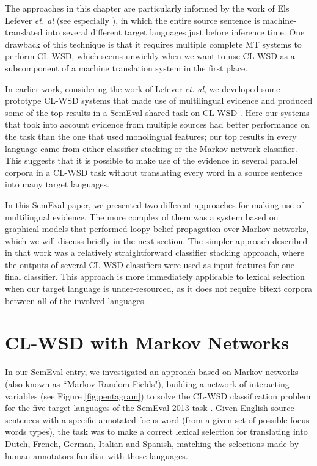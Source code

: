 The approaches in this chapter are particularly informed by the work of Els
Lefever \emph{et. al} (see especially
\cite{lefever-hoste-decock:2011:ACL-HLT2011}), in which the entire source
sentence is machine-translated into several different target languages just
before inference time. One drawback of this technique is that it requires
multiple complete MT systems to perform CL-WSD, which seems unwieldy when we
want to use CL-WSD as a subcomponent of a machine translation system in the
first place.

In earlier work, considering the work of Lefever \emph{et. al}, we developed
some prototype CL-WSD systems that made use of multilingual evidence
\cite{rudnick-liu-gasser:2013:SemEval-2013} and produced some of the top
results in a SemEval shared task on CL-WSD \cite{task10}.
Here our systems that took into account evidence from multiple sources had
better performance on the task than the one that used monolingual features; our
top results in every language came from either classifier stacking or the
Markov network classifier. This suggests that it is possible to make use
of the evidence in several parallel corpora in a CL-WSD task without
translating every word in a source sentence into many target languages.

In this SemEval paper, we presented two different approaches for making use of
multilingual evidence. The more complex of them was a system based on graphical
models that performed loopy belief propagation over Markov networks, which we
will discuss briefly in the next section. The simpler approach described in
that work was a relatively straightforward classifier stacking approach, where
the outputs of several CL-WSD classifiers were used as input features for one
final classifier. This approach is more immediately applicable to lexical
selection when our target language is under-resourced, as it does not require
bitext corpora between all of the involved languages.

\section{CL-WSD with Markov Networks}
In our SemEval entry, we investigated an approach based on Markov networks
(also known as ``Markov Random Fields"), building a network of interacting
variables (see Figure \ref{fig:pentagram}) to solve the CL-WSD classification
problem for the five target languages of the SemEval 2013 task \cite{task10}.
Given English source sentences with a specific annotated focus word (from a
given set of possible focus words types), the task was to make a correct
lexical selection for translating into Dutch, French, German, Italian and
Spanish, matching the selections made by human annotators familiar with those
languages.

